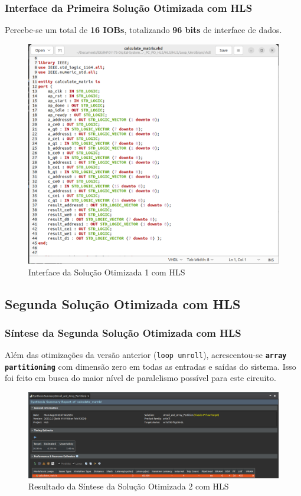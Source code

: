 \documentclass{beamer}
\begin{document}
    \begin{frame}
        \frametitle{Interface da Primeira Solução Otimizada com HLS}

        \begingroup {}
        Percebe-se um total de \textbf{16 IOBs}, totalizando
        \textbf{96 bits} de interface de dados.
        \endgroup

        \begin{figure}[h] 
            \centering
            \includegraphics[width=0.55\linewidth]{./images/solutions/VHDL_-_Loop_Unroll.png}
            \caption{\label{img:int-hls-optimized-solution-1} Interface da Solução Otimizada 1 com HLS}
          \end{figure}
    \end{frame}

    \subsection{Segunda Solução Otimizada com HLS}
    \begin{frame}
        \frametitle{Síntese da Segunda Solução Otimizada com HLS}

        \begingroup {}
        Além das otimizações da versão anterior (\texttt{loop unroll}), acrescentou-se
        \textbf{\texttt{array partitioning}} com dimensão zero em todas as entradas e
        saídas do sistema. Isso foi feito em busca do maior nível de paralelismo possível
        para este circuito.
        \endgroup

        \begin{figure}[h] 
            \centering
            \includegraphics[width=1\linewidth]{./images/solutions/HLS_-_Unroll_and_Array_Partitioning.png}
            \caption{\label{img:syn-hls-optimized-solution-2} Resultado da Síntese da Solução Otimizada 2 com HLS}
          \end{figure}
    \end{frame}
\end{document}
